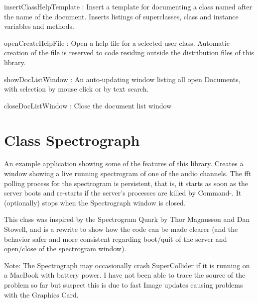 \documentclass[11pt]{article}
\begin{document}
   insertClassHelpTemplate : Insert a template for documenting a class named after the name of the
      document. Inserts listings of superclasses, class and instance variables and methods. 

   openCreateHelpFile : Open a help file for a selected user class. Automatic creation of the file 
         is reserved to code residing outside the distribution files of this library. 

   showDocListWindow :  An auto-updating window listing all open Documents, with selection by mouse click
               or by text search.

   closeDocListWindow : Close the document list window
\section{Class Spectrograph}
\label{sec-8}


An example application showing some of the features of this library. Creates a window showing a live running spectrogram of one of the audio channels. The fft polling process for the spectrogram is persistent, that is, it starts as soon as the server boots and re-starts if the server's processes are killed by Command-. It (optionally) stops when the Spectrograph window is closed. 

This class was inspired by the Spectrogram Quark by Thor Magnusson and Dan Stowell, and is a rewrite to show how the code can be made clearer (and the behavior safer and more consistent regarding boot/quit of the server and open/close of the spectrogram window). 

Note: The Spectrograph may occasionally crash SuperCollider if it is running on a MacBook with battery power. I have not been able to trace the source of the problem so far but suspect this is due to fast Image updates causing problems with the Graphics Card.
\end{document}

